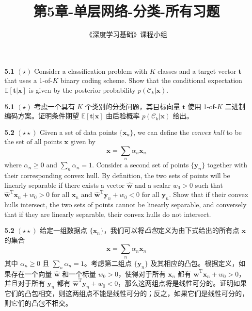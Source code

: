 \documentclass{article}
\title{第5章-单层网络-分类-所有习题}
\author{《深度学习基础》课程小组}
\begin{document}
\maketitle

\textbf{5.1} $(\star)$ Consider a classification problem with $K$ classes and a target vector $\mathbf{t}$ that uses a 1-of-$K$ binary coding scheme. Show that the conditional expectation $\mathbb{E}[\mathbf{t}|\mathbf{x}]$ is given by the posterior probability $p(\mathcal{C}_k|\mathbf{x})$.

\textbf{5.1} $(\star)$ 考虑一个具有 $K$ 个类别的分类问题，其目标向量 $\mathbf{t}$ 使用 1-of-$K$ 二进制编码方案。证明条件期望 $\mathbb{E}[\mathbf{t}|\mathbf{x}]$ 由后验概率 $p(\mathcal{C}_k|\mathbf{x})$ 给出。


\textbf{5.2} $(\star\star)$ Given a set of data points $\{\mathbf{x}_n\}$, we can define the \textit{convex hull} to be the set of all points $\mathbf{x}$ given by
\begin{equation}
\mathbf{x} = \sum_n \alpha_n \mathbf{x}_n \tag{5.96}
\end{equation}
where $\alpha_n \geqslant 0$ and $\sum_n \alpha_n = 1$. Consider a second set of points $\{\mathbf{y}_n\}$ together with their corresponding convex hull. By definition, the two sets of points will be linearly separable if there exists a vector $\widehat{\mathbf{w}}$ and a scalar $w_0 > 0$ such that $\widehat{\mathbf{w}}^{\mathrm{T}}\mathbf{x}_n + w_0 > 0$ for all $\mathbf{x}_n$ and $\widehat{\mathbf{w}}^{\mathrm{T}}\mathbf{y}_n + w_0 < 0$ for all $\mathbf{y}_n$. Show that if their convex hulls intersect, the two sets of points cannot be linearly separable, and conversely that if they are linearly separable, their convex hulls do not intersect.

\textbf{5.2} $(\star\star)$ 给定一组数据点 $\{\mathbf{x}_n\}$，我们可以将\textit{凸包}定义为由下式给出的所有点 $\mathbf{x}$ 的集合
\begin{equation}
\mathbf{x} = \sum_n \alpha_n \mathbf{x}_n \tag{5.96}
\end{equation}
其中 $\alpha_n \geqslant 0$ 且 $\sum_n \alpha_n = 1$。考虑第二组点 $\{\mathbf{y}_n\}$ 及其相应的凸包。根据定义，如果存在一个向量 $\widehat{\mathbf{w}}$ 和一个标量 $w_0 > 0$，使得对于所有 $\mathbf{x}_n$ 都有 $\widehat{\mathbf{w}}^{\mathrm{T}}\mathbf{x}_n + w_0 > 0$，并且对于所有 $\mathbf{y}_n$ 都有 $\widehat{\mathbf{w}}^{\mathrm{T}}\mathbf{y}_n + w_0 < 0$，那么这两组点将是线性可分的。证明如果它们的凸包相交，则这两组点不能是线性可分的；反之，如果它们是线性可分的，则它们的凸包不相交。
\end{document}
